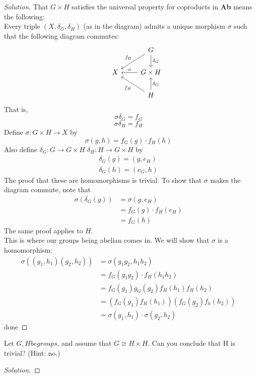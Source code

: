 \documentclass[12pt]{article}
\newenvironment{problem}[2][Problem]{\begin{trivlist}
\item[\hskip \labelsep {\bfseries #1}\hskip \labelsep {\bfseries #2.}]}{\end{trivlist}}
\newcommand{\catname}[1]{\normalfont\textbf{#1}}
\newenvironment{solution}
  {\renewcommand\qedsymbol{$\blacksquare$}\begin{proof}[Solution]}
{\end{proof}}
\begin{document}
\begin{solution}
  That $G\times H$ satisfies the universal property for coproducts in \catname{Ab} means the following:\\
  Every triple $(X, \delta_G, \delta_H)$ (as in the diagram) admits a unique morphism $\sigma$ 
  such that the following diagram commutes:
  \[\begin{tikzcd}
    & & G \ar{dl}[swap]{f_G} \ar{d}{\delta_G}\\
    & X & G\times H \ar{l}[swap]{\sigma} \\
    & & H \ar{ul}{f_H} \ar{u}[swap]{\delta_G}
  \end{tikzcd}\]
  That is, $$\sigma\delta_G = f_G$$ $$\sigma\delta_H = f_H$$
  Define $\sigma : G\times H \to X$ by 
  $$\sigma(g,h) = f_G(g)\cdot f_H(h)$$
  Also define $\delta_G : G\to G\times H$ $\delta_H : H\to G\times H$ by
  \begin{align*}
    \delta_G(g) = (g, e_H) \\
    \delta_G(h) = (e_G, h) 
  \end{align*}
  The proof that these are homomorphisms is trivial.
  To show that $\sigma$ makes the diagram commute, note that
  \begin{align*}
    \sigma(\delta_G(g)) &= \sigma(g,e_H) \\
    &= f_G(g)\cdot f_H(e_H) \\
    &= f_G(h)
  \end{align*}
  The same proof applies to $H$. \\
  This is where our groups being abelian comes in. We will show that $\sigma$ is a homomorphism:
  \begin{align*}
    \sigma\left( (g_1,h_1)(g_2,h_2) \right) &= \sigma(g_1g_2,h_1h_2) \\
    &= f_G(g_1g_2)\cdot f_H(h_1h_2) \\
    &= f_G(g_1)g_G(g_2)f_H(h_1)f_H(h_2) \\
    &= \left( f_G(g_1)f_H(h_1) \right)\left( f_G(g_2)f_h(h_2) \right) \\
    &= \sigma(g_1,h_1)\cdot\sigma(g_2,h_2)
  \end{align*}
  done
\end{solution}
\begin{problem}{3.4}
  Let $G,H be groups$, and assume that $G\cong H\times H$. Can you conclude that H is trivial? (Hint: no.)
\end{problem}
\begin{solution}
\end{solution}
\end{document}
